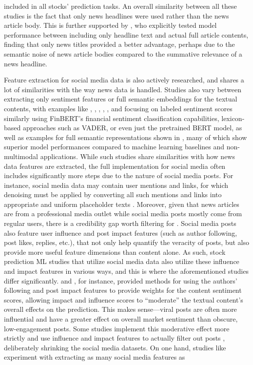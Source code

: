 \documentclass[stu,floatsintext]{apa7}
\begin{document}
included in all stocks’ prediction tasks. An overall similarity between all these studies is the fact that only news headlines were used rather than the news article body. This is further supported by \textcite{shi2018deepclue}, who explicitly tested model performance between including only headline text and actual full article contents, finding that only news titles provided a better advantage, perhaps due to the semantic noise of news article bodies compared to the summative relevance of a news headline.

Feature extraction for social media data is also actively researched, and shares a lot of similarities with the way news data is handled. Studies also vary between extracting only sentiment features or full semantic embeddings for the textual contents, with examples like \textcite{karadas2025multimodal}, \textcite{saravanos2024forecasting}, \textcite{ravat2025data}, \textcite{zhangp2025gnnbased}, \textcite{sun2025intraday}, and \textcite{sun2026intelligent} focusing on labeled sentiment scores similarly using FinBERT's financial sentiment classification capabilities, lexicon-based approaches such as VADER, or even just the pretrained BERT model, as well as examples for full semantic representations shown in \textcite{he2021multimodal}, many of which show superior model performances compared to machine learning baselines and non-multimodal applications. While such studies share similarities with how news data features are extracted, the full implementation for social media often includes significantly more steps due to the nature of social media posts. For instance, social media data may contain user mentions and links, for which denoising must be applied by converting all such mentions and links into appropriate and uniform placeholder texts \parencite{dashtaki2025hsif}. Moreover, given that news articles are from a professional media outlet while social media posts mostly come from regular users, there is a credibility gap worth filtering for \parencite{zhangp2025gnnbased}. Social media posts also feature user influence and post impact features (such as author following, post likes, replies, etc.), that not only help quantify the veracity of posts, but also provide more useful feature dimensions than content alone. As such, stock prediction ML studies that utilize social media data also utilize these influence and impact features in various ways, and this is where the aforementioned studies differ significantly. \textcite{karadas2025multimodal} and \textcite{sun2026intelligent}, for instance, provided methods for using the authors' following and post impact features to provide weights for the content sentiment scores, allowing impact and influence scores to ``moderate'' the textual content's overall effects on the prediction. This makes sense—viral posts are often more influential and have a greater effect on overall market sentiment than obscure, low-engagement posts. Some studies implement this moderative effect more strictly and use influence and impact features to actually filter out posts \parencite{zhangp2025gnnbased}, deliberately shrinking the social media datasets. On one hand, studies like \textcite{saravanos2024forecasting} experiment with extracting as many social media features as 
\end{document}
